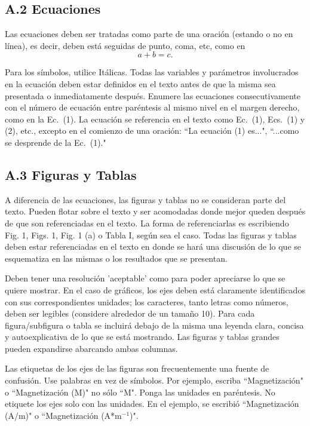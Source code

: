\documentclass[letterpaper, 10 pt, conference]{ieeeconf}  %
\begin{document}
\subsection*{A.2		Ecuaciones}

Las ecuaciones deben ser tratadas como parte de una oraci\'on (estando o no en l\'inea), es decir, deben est\'a seguidas de punto, coma, etc, como en
\begin{equation}
     a + b = c.
\end{equation}\label{ec:ejemplo}

Para los s\'imbolos, utilice It\'alicas. Todas las variables y par\'ametros involucrados en la ecuaci\'on deben estar definidos en el texto antes de que la misma sea presentada o inmediatamente despu\'es. Enumere las ecuaciones consecutivamente con el n\'umero de ecuaci\'on entre par\'entesis al mismo nivel en el margen derecho, como en la Ec.~(1). La ecuaci\'on se referencia en el texto como Ec.~(1), Ecs.~(1) y (2), etc., excepto en el comienzo de una oraci\'on: ``La ecuaci\'on (1) es...", ``...como se desprende de la Ec.~(1)."


 \subsection*{A.3		Figuras y Tablas}

A diferencia de las ecuaciones, las figuras y tablas no se consideran parte del texto. Pueden flotar sobre el texto y ser acomodadas donde mejor queden despu\'es de que son referenciadas en el texto. La forma de referenciarlas es escribiendo Fig. 1, Figs. 1, Fig. 1 (a) o Tabla I, seg\'un sea el caso. Todas las figuras y tablas deben estar referenciadas en el texto en donde se har\'a una discusi\'on de lo que se esquematiza en las mismas o los resultados que se presentan. 

Deben tener una resoluci\'on 'aceptable' como para poder apreciarse lo que se quiere mostrar. En el caso de gr\'aficos, los ejes deben est\'a claramente identificados con sus correspondientes unidades; los caracteres, tanto letras como n\'umeros, deben ser legibles (considere alrededor de un tama\~no 10). Para cada figura/subfigura o tabla se incluir\'a debajo de la misma una leyenda clara, concisa y autoexplicativa de lo que se est\'a mostrando. Las figuras y tablas grandes pueden expandirse abarcando ambas columnas.  

Las etiquetas de los ejes de las figuras son frecuentemente una fuente de confusi\'on.  Use palabras en vez de s\'imbolos. Por ejemplo, escriba ``Magnetizaci\'on" o ``Magnetizaci\'on (M)" no s\'olo ``M".  Ponga las unidades en par\'entesis.  No etiquete los ejes solo con las unidades.  En el ejemplo, se escribi\'o ``Magnetizaci\'on (A/m)" o ``Magnetizaci\'on (A*m$^{-1}$)".  
\end{document}
